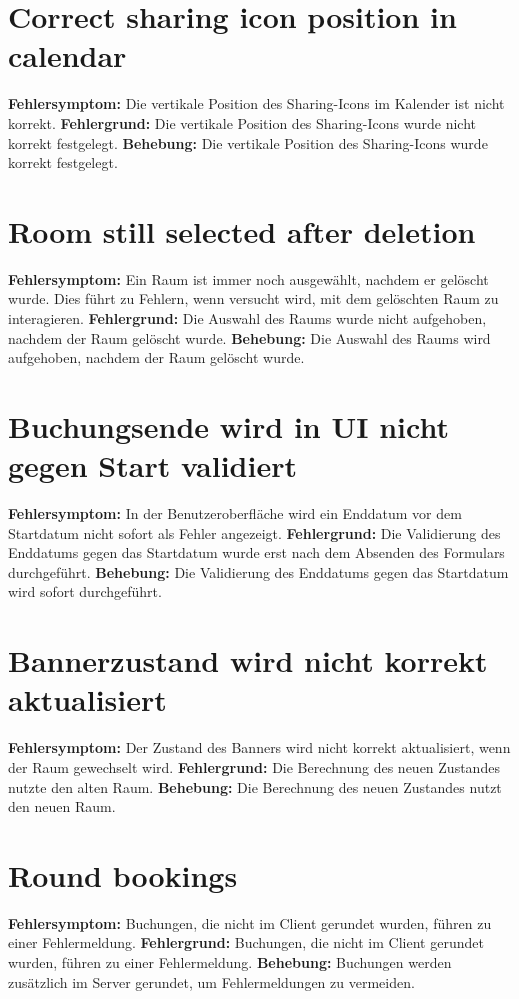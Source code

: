 \section{Correct sharing icon position in calendar}
\textbf{Fehlersymptom:} Die vertikale Position des Sharing-Icons im Kalender ist nicht korrekt.
\textbf{Fehlergrund:} Die vertikale Position des Sharing-Icons wurde nicht korrekt festgelegt.
\textbf{Behebung:} Die vertikale Position des Sharing-Icons wurde korrekt festgelegt.

\section{Room still selected after deletion}
\textbf{Fehlersymptom:} Ein Raum ist immer noch ausgewählt, nachdem er gelöscht wurde. Dies führt zu Fehlern, wenn versucht wird, mit dem gelöschten Raum zu interagieren.
\textbf{Fehlergrund:} Die Auswahl des Raums wurde nicht aufgehoben, nachdem der Raum gelöscht wurde.
\textbf{Behebung:} Die Auswahl des Raums wird aufgehoben, nachdem der Raum gelöscht wurde.

\section{Buchungsende wird in UI nicht gegen Start validiert}
\textbf{Fehlersymptom:} In der Benutzeroberfläche wird ein Enddatum vor dem Startdatum nicht sofort als Fehler angezeigt.
\textbf{Fehlergrund:} Die Validierung des Enddatums gegen das Startdatum wurde erst nach dem Absenden des Formulars durchgeführt.
\textbf{Behebung:} Die Validierung des Enddatums gegen das Startdatum wird sofort durchgeführt.

\section{Bannerzustand wird nicht korrekt aktualisiert}
\textbf{Fehlersymptom:} Der Zustand des Banners wird nicht korrekt aktualisiert, wenn der Raum gewechselt wird.
\textbf{Fehlergrund:} Die Berechnung des neuen Zustandes nutzte den alten Raum.
\textbf{Behebung:} Die Berechnung des neuen Zustandes nutzt den neuen Raum.

\section{Round bookings}
\textbf{Fehlersymptom:} Buchungen, die nicht im Client gerundet wurden, führen zu einer Fehlermeldung.
\textbf{Fehlergrund:} Buchungen, die nicht im Client gerundet wurden, führen zu einer Fehlermeldung.
\textbf{Behebung:} Buchungen werden zusätzlich im Server gerundet, um Fehlermeldungen zu vermeiden.

